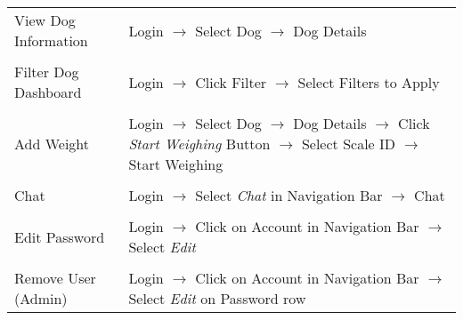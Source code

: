 \newlength\qqq
\newlength\qqqq
\setlength{}
\setlength{}
\begin{tabular}{p{\qqq}|p{\qqqq}}
View Dog Information & Login $\rightarrow$ Select Dog $\rightarrow$ Dog Details\\\\
Filter Dog Dashboard & Login $\rightarrow$ Click Filter $\rightarrow$ Select Filters to Apply\\\\
Add Weight & Login $\rightarrow$ Select Dog $\rightarrow$ Dog Details $\rightarrow$ Click \textit{Start Weighing} Button $\rightarrow$ Select Scale ID $\rightarrow$ Start Weighing\\\\
Chat & Login $\rightarrow$ Select \textit{Chat} in Navigation Bar $\rightarrow$ Chat\\\\
Edit Password & Login $\rightarrow$ Click on Account in Navigation Bar $\rightarrow$ Select \textit{Edit}\\\\
Remove User (Admin) & Login $\rightarrow$ Click on Account in Navigation Bar $\rightarrow$ Select \textit{Edit} on Password row 
\end{tabular}

